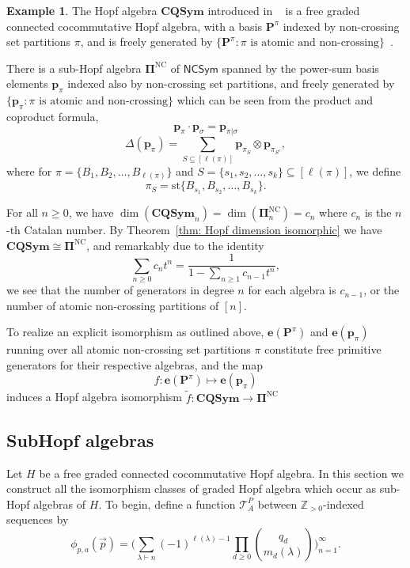 \documentclass[11pt]{amsart}
\theoremstyle{definition}
\newtheorem{example}[theorem]{Example}
\numberwithin{equation}{section}
\def\ZZ{{\mathbb Z}}
\newcommand{\lucas}[1]{\todo[size=\tiny,color=red!50]{#1 \\ \hfill --- Lucas}}
\begin{document}
\begin{example}
    The Hopf algebra $\mathbf{CQSym}$ introduced in ~\cite{NT05} is a free graded connected cocommutative Hopf algebra, with a basis $\mathbf{P}^{\pi}$ indexed by non-crossing set partitions $\pi$, and is freely generated by $\{\mathbf{P}^{\pi}:\pi \text{ is atomic and non-crossing}\}$~\cite[NT05]{Prop. 5.2}. 

    There is a sub-Hopf algebra $\mathbf{\Pi}^{\mathrm{NC}}$ of $\mathsf{NCSym}$ spanned by the power-sum basis elements $\mathbf{p}_{\pi}$ indexed also by non-crossing set partitions, and freely generated by $\{\mathbf{p}_{\pi}:\pi \text{ is atomic and non-crossing}\}$ which can be seen from the product and coproduct formula,
    \[
    \mathbf{p}_{\pi}\cdot \mathbf{p}_{\sigma} = \mathbf{p}_{\pi | \sigma}
    \]
    \[
    \Delta (\mathbf{p}_{\pi}) = \sum_{S \subseteq [\ell (\pi)]} \mathbf{p}_{\pi_S} \otimes \mathbf{p}_{\pi_{S^c}},
    \]
    where for $\pi = \{B_1,B_2, \ldots, B_{\ell(\pi)}\}$ and $S = \{s_1,s_2, \ldots, s_k\} \subseteq [\ell(\pi)]$, we define 
    \[
    \pi_{S} = \mathrm{st}\{B_{s_1},B_{s_2}, \ldots, B_{s_k}\}.
    \]
    
    For all $n \geq 0$, we have $\dim(\mathbf{CQSym}_n) = \dim(\mathbf{\Pi}^{\mathrm{NC}}_n) = c_n$ where $c_n$ is the $n$-th Catalan number. By Theorem~\ref{thm: Hopf dimension isomorphic} we have $\mathbf{CQSym} \cong \mathbf{\Pi}^{\mathrm{NC}}$, and remarkably due to the identity 
    \[
    \sum_{n \geq 0}c_nt^n = \frac{1}{1-\sum_{n \geq 1}c_{n-1}t^n},
    \]
    we see that the number of generators in degree $n$ for each algebra is $c_{n-1}$, or the number of atomic non-crossing partitions of $[n]$. 

    To realize an explicit isomorphism as outlined above, $\mathbf{e}(\mathbf{P}^{\pi})$ and $\mathbf{e}(\mathbf{p}_{\pi})$ running over all atomic non-crossing set partitions $\pi$ constitute free primitive generators for their respective algebras, and the map
    \[
    f:\mathbf{e}(\mathbf{P}^{\pi}) \mapsto \mathbf{e}(\mathbf{p}_{\pi})
    \]
    induces a Hopf algebra isomorphism $\tilde{f}:\mathbf{CQSym} \to \mathbf{\Pi}^{\mathrm{NC}}$
\end{example}


\subsection{SubHopf algebras}
\lucas{Lucas will work on this.}

Let $H$ be a free graded connected cocommutative Hopf algebra.  
In this section we construct all the isomorphism classes of graded Hopf algebra which occur as sub-Hopf algebras of $H$.  
To begin, define a function $\mathcal{T}^{P}_{A}$ between $\ZZ_{> 0}$-indexed sequences by
\[
\phi_{p, a}(\vec{p}) = \big( \sum_{\lambda \vdash n} (-1)^{\ell(\lambda) - 1} \prod_{d \ge 0} \binom{q_{d}}{m_{d}(\lambda)} \big)_{n = 1}^{\infty}.
\]
\end{document}
